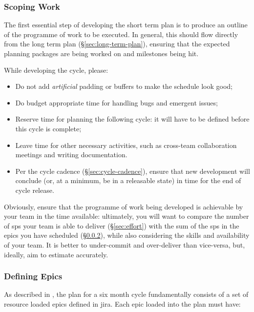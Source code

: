 \subsubsection{Scoping Work}\label{scoping-work}

The first essential step of developing the short term plan is to produce an outline of the programme of work to be executed.
In general, this should flow directly from the long term plan (\S\ref{sec:long-term-plan}), ensuring that the expected planning packages are being worked on and milestones being hit.

While developing the \gls{cycle}, please:

\begin{itemize}
\item
  Do not add \emph{artificial} padding or buffers to make the schedule look good;
\item
  Do budget appropriate time for handling bugs and emergent issues;
\item
  Reserve time for planning the following \gls{cycle}: it will have to be defined before this \gls{cycle} is complete;
\item
  Leave time for other necessary activities, such as cross-team collaboration meetings and writing documentation.
\item
  Per the \gls{cycle} cadence (\S\ref{sec:cycle-cadence}), ensure that new development will conclude (or, at a minimum, be in a releasable state) in time for the end of \gls{cycle} release.
\end{itemize}

Obviously, ensure that the programme of work being developed is achievable by your team in the time available: ultimately, you will want to compare the number of \glspl{sp} your team is able to deliver (\S\ref{sec:effort}) with the sum of the \glspl{sp} in the \glspl{epic} you have scheduled (\S\ref{sec:planning-epics}), while also considering the skills and availability of your team.
It is better to under-commit and over-deliver than vice-versa, but, ideally, aim to estimate accurately.

\subsubsection{Defining Epics}
\label{sec:planning-epics}

As described in , the plan for a six month \gls{cycle} fundamentally consists of a set of resource loaded \glspl{epic} defined in \gls{jira}.
Each \gls{epic} loaded into the plan must have:

